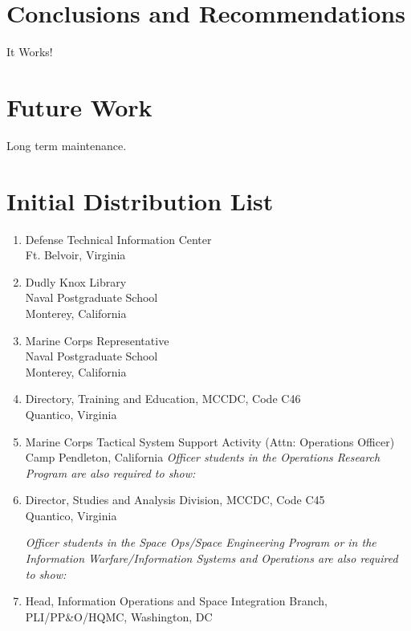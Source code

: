 \documentclass[twoside,thesis,twoadvisors]{npsreport}
\begin{document}
\chapter{Conclusions and Recommendations}
It Works!

\chapter{Future Work}
Long term maintenance.




\NPSend         


\chapter*{Initial Distribution List}
\singlespace
\begin{enumerate}
\item Defense Technical Information Center\\Ft. Belvoir, Virginia
\item Dudly Knox Library\\Naval Postgraduate School\\Monterey, California
\item Marine Corps Representative\\Naval Postgraduate School\\Monterey, California
\item Directory, Training and Education, MCCDC, Code C46\\Quantico, Virginia
\item Marine Corps Tactical System Support Activity (Attn: Operations
  Officer)\\Camp Pendleton, California
\textit{Officer students in the Operations Research Program are also required
to show:}

\item Director, Studies and Analysis Division, MCCDC, Code C45\\
Quantico, Virginia

\textit{Officer students in the Space Ops/Space Engineering Program or in the
Information Warfare/Information Systems and Operations are also
required to show:}

\item Head, Information Operations and Space Integration Branch,\\
PLI/PP\&O/HQMC, Washington, DC
\end{enumerate}
\end{document}
